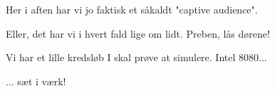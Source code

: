 \documentclass[a4paper,11pt]{article}
\begin{document}
\begin{sketch}
 Her i aften har vi jo faktisk et såkaldt "captive audience".

 Eller, det har vi i hvert fald lige om lidt. Preben, lås dørene!


 Vi har et lille kredsløb I skal prøve at simulere. Intel 8080...


 ... sæt i værk!


\end{sketch}
\end{document}
